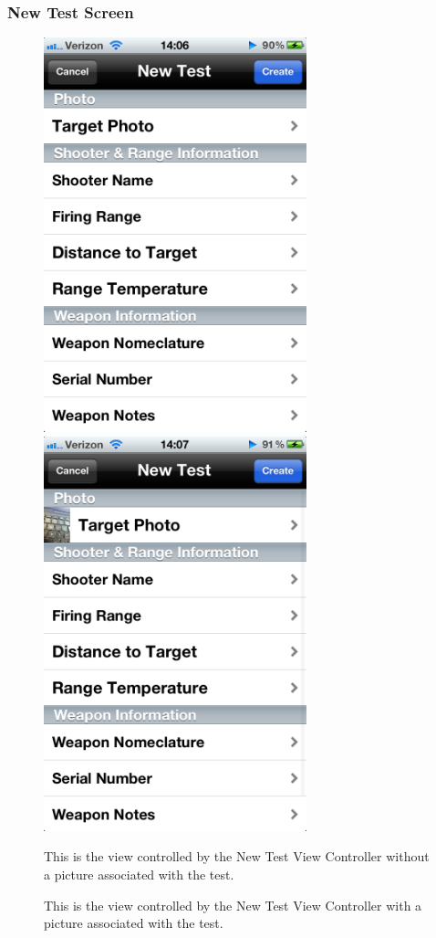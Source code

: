 \newpage
\subsubsection{New Test Screen}
\begin{figure}[H!htb]
\includegraphics[width=3in]{ScreenShots111011/NewTest.png}
\includegraphics[width=3in]{ScreenShots111011/NewTestPhoto.png}
\caption{This is the view controlled by the New Test View Controller without a picture associated with the test.}
\caption{This is the view controlled by the New Test View Controller with a picture associated with the test.}
\end{figure}

